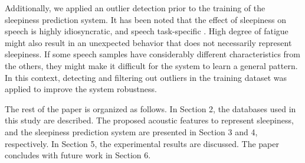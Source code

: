 
Additionally, we applied an outlier detection prior to the training of the sleepiness prediction system.
It has been noted that the effect of sleepiness on speech is highly idiosyncratic, and speech task-specific \cite{Greeley2007, Vogel2011}.
High degree of fatigue might also result in an unexpected behavior that does not necessarily represent sleepiness.
If some speech samples have considerably different characteristics from the others, they might make it difficult for the system to learn a general pattern.
In this context, detecting and filtering out outliers in the training dataset was applied to improve the system robustness.  

The rest of the paper is organized as follows. In Section 2, the databases used in this study are described. The proposed acoustic features to represent sleepiness, and the sleepiness prediction system are presented in Section 3 and 4, respectively. In Section 5, the experimental results are discussed. The paper concludes with future work in Section 6.



